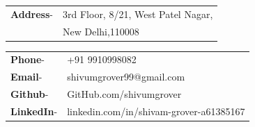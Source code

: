\documentclass[10pt]{article}
\begin{document}
\begin{minipage}{0.55\textwidth}

\vspace{5mm}
\hspace{3mm}
\begin{tabular}{l l}\raggedleft
\color{black!70}\textbf{Address}-& \color{black!70}3rd Floor, 8/21, West Patel Nagar, \\  
    
    & \color{black!70}New Delhi,110008\\

\end{tabular}
\end{minipage}
\begin{minipage}{0.4\textwidth}

\vspace{5mm}
\begin{flushright}
\begin{tabular}{l l}\raggedleft

\color{black!70}\textbf{Phone}-& \color{black!70}+91 9910998082\\ 
\color{black!70}\textbf{Email}-& \color{black!70}shivumgrover99@gmail.com\\
\color{black!70}\textbf{Github}-& \color{black!70}GitHub.com/shivumgrover\\
\color{black!70}\textbf{LinkedIn}-& \color{black!70}linkedin.com/in/shivam-grover-a61385167\\
\end{tabular}
\end{flushright}



\end{minipage}
\end{document}
